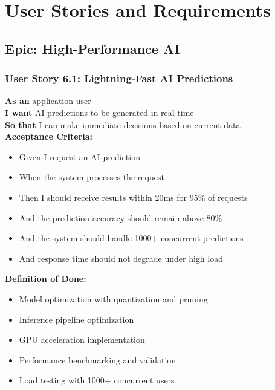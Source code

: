 \section{User Stories and Requirements}

\subsection{Epic: High-Performance AI}

\subsubsection{User Story 6.1: Lightning-Fast AI Predictions}

\begin{tcolorbox}[colback=lightgray, colframe=primaryblue, title=US-6.1: Lightning-Fast AI Predictions]
\textbf{As an} application user \\
\textbf{I want} AI predictions to be generated in real-time \\
\textbf{So that} I can make immediate decisions based on current data \\

\textbf{Acceptance Criteria:}
\begin{itemize}
    \item Given I request an AI prediction
    \item When the system processes the request
    \item Then I should receive results within 20ms for 95\% of requests
    \item And the prediction accuracy should remain above 80\%
    \item And the system should handle 1000+ concurrent predictions
    \item And response time should not degrade under high load
\end{itemize}

\textbf{Definition of Done:}
\begin{itemize}
    \item Model optimization with quantization and pruning
    \item Inference pipeline optimization
    \item GPU acceleration implementation
    \item Performance benchmarking and validation
    \item Load testing with 1000+ concurrent users
\end{itemize}
\end{tcolorbox}


